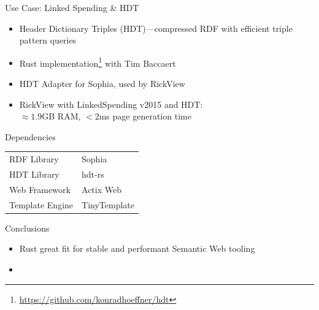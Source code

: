 \documentclass[14pt,aspectratio=169]{beamer}
\begin{document}
\begin{frame}{Use Case: Linked Spending \& HDT}
\begin{itemize}
\item Header Dictionary Triples (HDT)---compressed RDF with efficient triple pattern queries
\item Rust implementation\footnote{\url{https://github.com/konradhoeffner/hdt}} with Tim Baccaert
\item HDT Adapter for Sophia, used by RickView
\item RickView with LinkedSpending v2015 and HDT:\\$\approx 1.9$GB RAM,  $<2$ms page generation time
\end{itemize}
\end{frame}

\begin{frame}{Dependencies}
\begin{tabular}{ll}
RDF Library		&Sophia\\%
HDT Library		&hdt-rs\\
Web Framework	&Actix Web\\
Template Engine	&TinyTemplate\\
\end{tabular}
\end{frame}

\begin{frame}{Conclusions}
\begin{itemize}
\item Rust great fit for stable and performant Semantic Web tooling
\item 
\end{itemize}
\end{frame}
\end{document}

